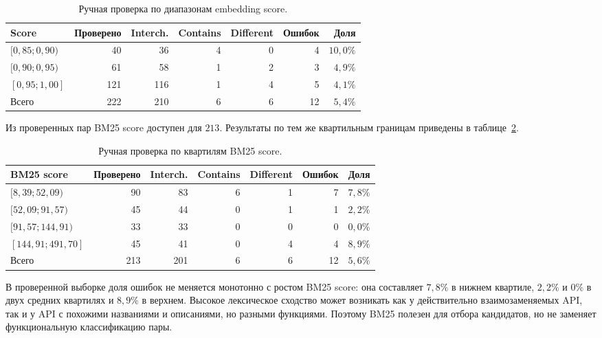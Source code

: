 \documentclass[12pt,a4paper]{article}
\begin{document}
\begin{table}[ht]
    \centering
    \small
    \begin{tabular}{lrrrrrr}
        \toprule
        Score & Проверено & Interch. & Contains & Different & Ошибок & Доля \\
        \midrule
        $[0{,}85; 0{,}90)$ & 40  & 36  & 4 & 0 & 4 & $10{,}0\%$ \\
        $[0{,}90; 0{,}95)$ & 61  & 58  & 1 & 2 & 3 & $4{,}9\%$ \\
        $[0{,}95; 1{,}00]$ & 121 & 116 & 1 & 4 & 5 & $4{,}1\%$ \\
        \midrule
        Всего                & 222 & 210 & 6 & 6 & 12 & $5{,}4\%$ \\
        \bottomrule
    \end{tabular}
    \caption{Ручная проверка по диапазонам embedding score.}
    \label{tab:review-by-embedding}
\end{table}

Из проверенных пар BM25 score доступен для $213$. Результаты по тем же
квартильным границам приведены в таблице~\ref{tab:review-by-bm25}.

\begin{table}[ht]
    \centering
    \small
    \begin{tabular}{lrrrrrr}
        \toprule
        BM25 score & Проверено & Interch. & Contains & Different & Ошибок & Доля \\
        \midrule
        $[8{,}39; 52{,}09)$    & 90 & 83 & 6 & 1 & 7 & $7{,}8\%$ \\
        $[52{,}09; 91{,}57)$   & 45 & 44 & 0 & 1 & 1 & $2{,}2\%$ \\
        $[91{,}57; 144{,}91)$  & 33 & 33 & 0 & 0 & 0 & $0{,}0\%$ \\
        $[144{,}91; 491{,}70]$ & 45 & 41 & 0 & 4 & 4 & $8{,}9\%$ \\
        \midrule
        Всего                   & 213 & 201 & 6 & 6 & 12 & $5{,}6\%$ \\
        \bottomrule
    \end{tabular}
    \caption{Ручная проверка по квартилям BM25 score.}
    \label{tab:review-by-bm25}
\end{table}

В проверенной выборке доля ошибок не меняется монотонно с ростом BM25 score:
она составляет $7{,}8\%$ в нижнем квартиле, $2{,}2\%$ и $0\%$ в двух средних
квартилях и $8{,}9\%$ в верхнем. Высокое лексическое сходство может возникать
как у действительно взаимозаменяемых API, так и у API с похожими названиями и
описаниями, но разными функциями. Поэтому BM25 полезен для отбора кандидатов,
но не заменяет функциональную классификацию пары.
\end{document}
